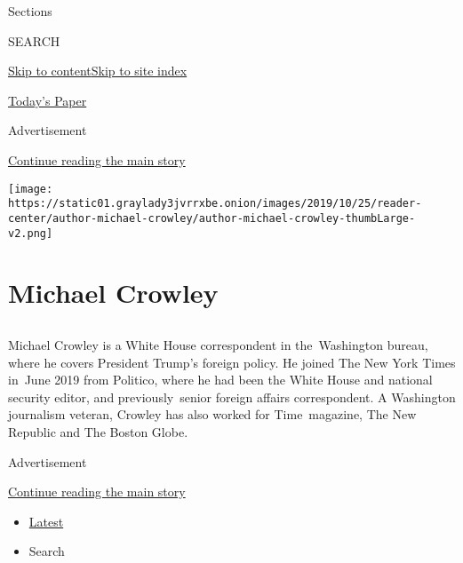 Sections

SEARCH

\protect\hyperlink{site-content}{Skip to
content}\protect\hyperlink{site-index}{Skip to site index}

\href{https://myaccount.nytimes3xbfgragh.onion/auth/login?response_type=cookie\&client_id=vi}{}

\href{https://www.nytimes3xbfgragh.onion/section/todayspaper}{Today's
Paper}

Advertisement

\protect\hyperlink{after-top}{Continue reading the main story}

\texttt{[image: https://static01.graylady3jvrrxbe.onion/images/2019/10/25/reader-center/author-michael-crowley/author-michael-crowley-thumbLarge-v2.png]}

\hypertarget{michael-crowley}{%
\section{Michael Crowley}\label{michael-crowley}}

\subsection{}

Michael Crowley is a White House correspondent in the~Washington bureau,
where he covers President Trump's foreign policy. He joined The New York
Times in~June 2019 from Politico, where he had been the White House and
national security editor, and previously~senior foreign affairs
correspondent. A Washington journalism veteran, Crowley has also worked
for Time~magazine, The New Republic and The Boston Globe.

Advertisement

\protect\hyperlink{after-mid1}{Continue reading the main story}

\begin{itemize}
\tightlist
\item
  \protect\hyperlink{stream-panel}{Latest}
\item
  Search
\end{itemize}

